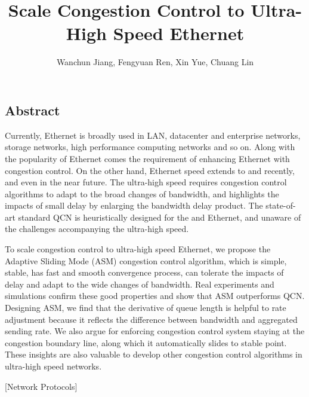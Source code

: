 \documentclass{sig-alternate-10pt}
\begin{document}
\title{Scale Congestion Control to Ultra-High Speed Ethernet}


\author{Wanchun Jiang, Fengyuan Ren, Xin Yue, Chuang Lin}


\maketitle

\thispagestyle{empty}
\makeatletter
\newcommand{\rmnum}[1]{\romannumeral #1}
\newcommand{\Rmnum}[1]{\expandafter\@slowromancap\romannumeral #1@}
\makeatother



\subsection*{Abstract}
Currently, Ethernet is broadly used in LAN, datacenter and enterprise networks, storage networks, high performance computing networks and so on. Along with the popularity of Ethernet comes the requirement of enhancing Ethernet with congestion control. On the other hand, Ethernet speed extends to  and  recently, and even  in the near future. The ultra-high speed requires congestion control algorithms to adapt to the broad changes of bandwidth, and highlights the impacts of small delay by enlarging the bandwidth delay product. The state-of-art standard QCN is heuristically designed for the  and  Ethernet, and unaware of the challenges accompanying the ultra-high speed. 

To scale congestion control to ultra-high speed Ethernet, we propose the Adaptive Sliding Mode (ASM) congestion control algorithm, which is simple, stable, has fast and smooth convergence process, can tolerate the impacts of delay and adapt to the wide changes of bandwidth. Real experiments and simulations confirm these good properties and show that ASM outperforms QCN. Designing ASM, we find that the derivative of queue length is helpful to rate adjustment because it reflects the difference between bandwidth and aggregated sending rate. We also argue for enforcing congestion control system staying at the congestion boundary line, along which it automatically slides to stable point. These insights are also valuable to develop other congestion control algorithms in ultra-high speed networks. 

[Network Protocols] 
\end{document}
